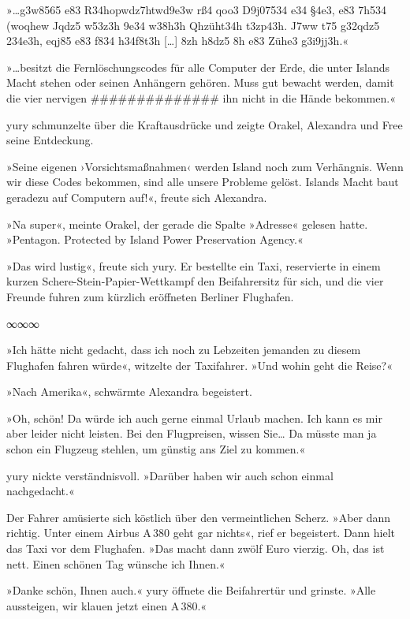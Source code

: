 »…g3w8565 e83 R34hopwdz7htwd9e3w rß4 qoo3 D9j07534 e34 §4e3, e83 7h534 (woqhew Jqdz5 w53z3h 9e34 w38h3h Qhzüht34h t3zp43h. J7ww t75 g32qdz5 234e3h, eqj85 e83 f834 h34f8t3h […] 8zh h8dz5 8h e83 Zühe3 g3i9jj3h.«

»…besitzt die Fernlöschungscodes für alle Computer der Erde, die unter Islands Macht stehen oder seinen Anhängern gehören. Muss gut bewacht werden, damit die vier nervigen \#\#\#\#\#\#\#\#\#\#\#\#\#\# ihn nicht in die Hände bekommen.«

yury schmunzelte über die Kraftausdrücke und zeigte Orakel, Alexandra und Free seine Entdeckung.

»Seine eigenen ›Vorsichtsmaßnahmen‹ werden Island noch zum Verhängnis. Wenn wir diese Codes bekommen, sind alle unsere Probleme gelöst. Islands Macht baut geradezu auf Computern auf!«, freute sich Alexandra.

»Na super«, meinte Orakel, der gerade die Spalte »Adresse« gelesen hatte. »Pentagon. Protected by Island Power Preservation Agency.«

»Das wird lustig«, freute sich yury. Er bestellte ein Taxi, reservierte in einem kurzen Schere-Stein-Papier-Wettkampf den Beifahrersitz für sich, und die vier Freunde fuhren zum kürzlich eröffneten Berliner Flughafen.

\begin{center}
    ∞∞∞
\end{center}

»Ich hätte nicht gedacht, dass ich noch zu Lebzeiten jemanden zu diesem Flughafen fahren würde«, witzelte der Taxifahrer. »Und wohin geht die Reise?«

»Nach Amerika«, schwärmte Alexandra begeistert.

»Oh, schön! Da würde ich auch gerne einmal Urlaub machen. Ich kann es mir aber leider nicht leisten. Bei den Flugpreisen, wissen Sie… Da müsste man ja schon ein Flugzeug stehlen, um günstig ans Ziel zu kommen.«

yury nickte verständnisvoll. »Darüber haben wir auch schon einmal nachgedacht.«

Der Fahrer amüsierte sich köstlich über den vermeintlichen Scherz. »Aber dann richtig. Unter einem Airbus A\,380 geht gar nichts«, rief er begeistert. Dann hielt das Taxi vor dem Flughafen. »Das macht dann zwölf Euro vierzig. Oh, das ist nett. Einen schönen Tag wünsche ich Ihnen.«

»Danke schön, Ihnen auch.« yury öffnete die Beifahrertür und grinste. »Alle aussteigen, wir klauen jetzt einen A\,380.«

